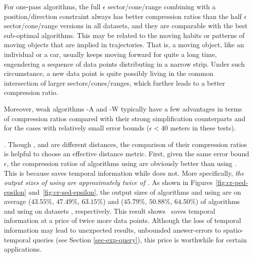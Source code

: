 For one-pass algorithms, the full $\epsilon$ sector/cone/range combining with a position/direction constraint always has better compression ratios than the half $\epsilon$ sector/cone/range versions in all datasets, and they are comparable with the best sub-optimal algorithms.
This may be related to the moving habits or patterns of moving objects that are implied in trajectories.
That is, a moving object, like an individual or a car, usually keeps moving forward for quite a long time, engendering a sequence of data points distributing in a narrow strip. Under such circumstance, a new data point is quite possibly living in the common intersection of larger sectors/cones/ranges, which further leads to a better compression ratio.

{Moreover, weak algorithms \operb-A and \cised-W typically have a few advantages in terms of compression ratios compared with their strong simplification counterparts \operb and \cised for the cases with relatively small error bounds (\eg $\epsilon<40$ meters in these tests).}




.
Though \ped, \sed and \dad are different distances, the comparison of their compression ratios is helpful to choose an effective distance metric.
%
First,  given the same error bound $\epsilon$, the compression ratios of algorithms using \ped are obviously better
than using \sed.
{This is because \sed saves temporal information while \ped does not}.
More specifically, \emph{the output sizes of using \sed are approximately twice of \ped.}
%
As shown in Figures~\ref{fig:cr-ped-epsilon} and~\ref{fig:cr-sed-epsilon}, the output sizes of algorithms \tpa and \dpa
using \ped are on average ($43.55\%$, $47.49\%$, $63.15\%$) and ($45.79\%$,
$50.88\%$, $64.50\%$) of algorithms \tpa and \dpa using \sed on datasets \dSets, respectively.
%
%
This result shows ~\sed saves temporal information at a price of twice more data points. {Although the loss of temporal information may lead to unexpected results, \eg unbounded answer-errors to spatio-temporal queries (see Section \ref{sec-exp-query}), this price is worthwhile for certain applications. }


